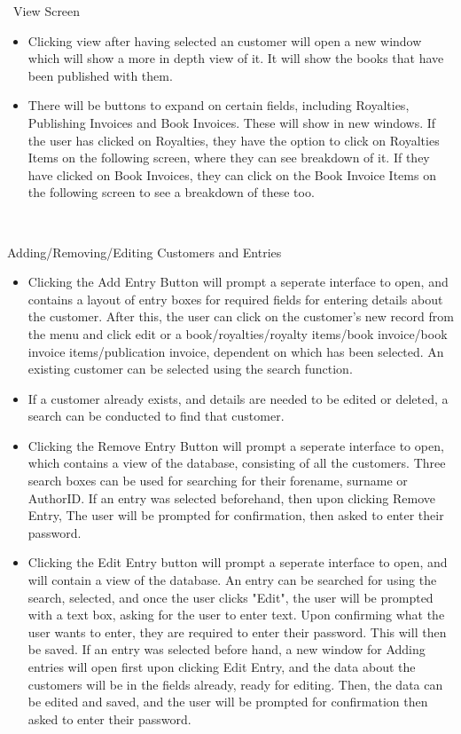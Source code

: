 \
View Screen
\begin{itemize}
    \item Clicking view after having selected an customer will open a new window which will show a more in depth view of it. It will show the books that have been published with them.
    \item There will be buttons to expand on certain fields, including Royalties, Publishing Invoices and Book Invoices. These will show in new windows. If the user has clicked on Royalties, they have the option to click on Royalties Items on the following screen, where they can see breakdown of it. If they have clicked on Book Invoices, they can click on the Book Invoice Items on the following screen to see a breakdown of these too.
\end{itemize}

\

Adding/Removing/Editing Customers and Entries
\begin{itemize}
    \item Clicking the Add Entry Button will prompt a seperate interface to open, and contains a layout of entry boxes for required fields for entering details about the customer. After this, the user can click on the customer's new record from the menu and click edit or a book/royalties/royalty items/book invoice/book invoice items/publication invoice, dependent on which has been selected. An existing customer can be selected using the search function.
    \item If a customer already exists, and details are needed to be edited or deleted, a search can be conducted to find that customer.
    \item Clicking the Remove Entry Button will prompt a seperate interface to open, which contains a view of the database, consisting of all the customers. Three search boxes can be used for searching for their forename, surname or AuthorID. If an entry was selected beforehand, then upon clicking Remove Entry, The user will be prompted for confirmation, then asked to enter their password. 
    \item Clicking the Edit Entry button will prompt a seperate interface to open, and will contain a view of the database. An entry can be searched for using the search, selected, and once the user clicks "Edit", the user will be prompted with a text box, asking for the user to enter text. Upon confirming what the user wants to enter, they are required to enter their password. This will then be saved. If an entry was selected before hand, a new window for Adding entries will open first upon clicking Edit Entry, and the data about the customers will be in the fields already, ready for editing. Then, the data can be edited and saved, and the user will be prompted for confirmation then asked to enter their password.
\end{itemize}

